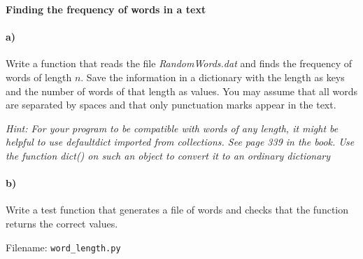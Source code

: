\begin{Problem}{\textbf{Finding the frequency of words in a text}} \label{prob64}

\paragraph{a)}
Write a function that reads the file \emph{RandomWords.dat} and finds the frequency
of words of length $n$. Save the information in a dictionary with the length
as keys and the number of words of that length as values.  You may assume that
all words are separated by spaces and that only punctuation marks appear in the
text.

\emph{Hint: For your program to be compatible with words of any length, it might
be helpful to use defaultdict imported from collections. See page 339 in the book.
Use the function dict() on such an object to convert it to an ordinary dictionary}
\paragraph{b)}
Write a test function that generates a file of words and checks that the function
returns the correct values.

Filename: \texttt{word\_length.py}
\end{Problem}


